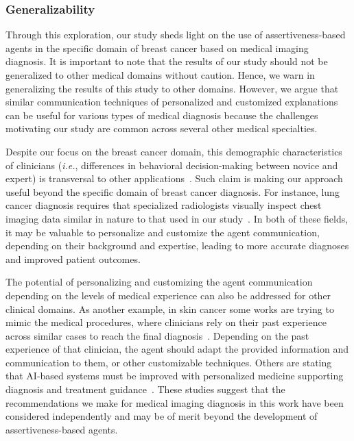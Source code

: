 \subsubsection{Generalizability}
\label{sec:chap006007001004}

Through this exploration, our study sheds light on the use of assertiveness-based agents in the specific domain of breast cancer based on medical imaging diagnosis.
It is important to note that the results of our study should not be generalized to other medical domains without caution.
Hence, we warn in generalizing the results of this study to other domains.
However, we argue that similar communication techniques of personalized and customized explanations can be useful for various types of medical diagnosis because the challenges motivating our study are common across several other medical specialties.

Despite our focus on the breast cancer domain, this demographic characteristics of clinicians ({\it i.e.}, differences in behavioral decision-making between novice and expert) is transversal to other applications~\cite{STAHNKE2021103243, LANDRO2020102897, doi:10.1080/21642850.2020.1741372}.
Such claim is making our approach useful beyond the specific domain of breast cancer diagnosis.
For instance, lung cancer diagnosis requires that specialized radiologists visually inspect chest imaging data similar in nature to that used in our study~\cite{10.1145/3313831.3376807}.
In both of these fields, it may be valuable to personalize and customize the agent communication, depending on their background and expertise, leading to more accurate diagnoses and improved patient outcomes.

The potential of personalizing and customizing the agent communication depending on the levels of medical experience can also be addressed for other clinical domains.
As another example, in skin cancer some works are trying to mimic the medical procedures, where clinicians rely on their past experience across similar cases to reach the final diagnosis~\cite{10.1007/978-3-030-87199-4_52, Tschandl2020, Esteva2017}.
Depending on the past experience of that clinician, the agent should adapt the provided information and communication to them, or other customizable techniques.
Others are stating that AI-based systems must be improved with personalized medicine supporting diagnosis and treatment guidance~\cite{Sollini2020, Aerts2016, IBRAHIM2019438}.
These studies suggest that the recommendations we make for medical imaging diagnosis in this work have been considered independently and may be of merit beyond the development of assertiveness-based agents.

